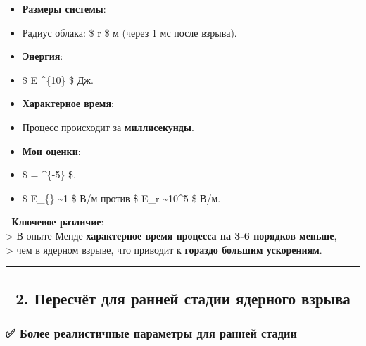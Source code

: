 \documentclass[11pt]{article}
\providecommand{\tightlist}{%
      \setlength{\itemsep}{0pt}\setlength{\parskip}{0pt}}
\begin{document}
\begin{itemize}
\tightlist
\item
  \textbf{Размеры системы}:\\
\item
  Радиус облака: \$ r  \$ м (через 1 мс после взрыва).
\item
  \textbf{Энергия}:\\
\item
  \$ E  \^{}\{10\} \$ Дж.
\item
  \textbf{Характерное время}:\\
\item
  Процесс происходит за \textbf{миллисекунды}.
\item
  \textbf{Мои оценки}:\\
\item
  \$ \eta =  \^{}\{-5\} \$,\\
\item
  \$ E\_\{\parallel\} \sim 1 \$ В/м против \$ E\_r \sim 10\^{}5 \$ В/м.
\end{itemize}

📌 \textbf{Ключевое различие}:\\
\textgreater{} В опыте Менде \textbf{характерное время процесса на 3-6
порядков меньше},\\
\textgreater{} чем в ядерном взрыве, что приводит к \textbf{гораздо
большим ускорениям}.

\begin{center}\rule{0.5\linewidth}{\linethickness}\end{center}

\subsection{🔹 2. Пересчёт для ранней стадии ядерного
взрыва}\label{ux43fux435ux440ux435ux441ux447ux451ux442-ux434ux43bux44f-ux440ux430ux43dux43dux435ux439-ux441ux442ux430ux434ux438ux438-ux44fux434ux435ux440ux43dux43eux433ux43e-ux432ux437ux440ux44bux432ux430}

\subsubsection{✅ Более реалистичные параметры для ранней
стадии}\label{ux431ux43eux43bux435ux435-ux440ux435ux430ux43bux438ux441ux442ux438ux447ux43dux44bux435-ux43fux430ux440ux430ux43cux435ux442ux440ux44b-ux434ux43bux44f-ux440ux430ux43dux43dux435ux439-ux441ux442ux430ux434ux438ux438}
\end{document}
